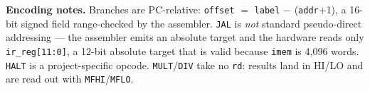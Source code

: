 \documentclass[
  25pt,
  margin=0.8in,
  innermargin=0.6in,
  colspace=0.8in,
  blockverticalspace=0.32in
]{tikzposter}
\begin{document}
\begin{columns}
{  \vspace{0.5em}
  \textbf{Encoding notes.} Branches are PC-relative: \texttt{offset} $=$
  \texttt{label} $-$ (\texttt{addr}$+$1), a 16-bit signed field
  range-checked by the assembler. \texttt{JAL} is \emph{not} standard
  pseudo-direct addressing --- the assembler emits an absolute target and
  the hardware reads only \texttt{ir\_reg[11:0]}, a 12-bit absolute target
  that is valid because \texttt{imem} is 4{,}096 words. \texttt{HALT} is a
  project-specific opcode. \texttt{MULT}/\texttt{DIV} take no
  \texttt{rd}: results land in HI/LO and are read out with
  \texttt{MFHI}/\texttt{MFLO}.
}
\end{columns}

\end{document}
